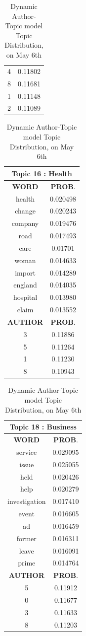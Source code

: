 \begin{table}[h!]
\begin{tabular}{|c c|}
4 &  0.11802\\
8  &   0.11681\\
1   &  0.11148\\
2   &  0.11089\\
 \hline
 \end{tabular} 
\hfill
 \begin{tabular}{|c c|} 
\hline
\multicolumn{2}{|c|}{\textbf{Topic 16 : Health}} \\
\hline
 \textbf{WORD} & \textbf{PROB}.  \\ [0.3ex] 
 \hline
	health  & 0.020498\\
	change  &  0.020243\\
	company  &  0.019476\\
	road   & 0.017493\\
	care  &  0.01701\\
	woman &   0.014633\\
	import  &  0.014289\\
	england   & 0.014035\\
	hospital  &  0.013980\\
	claim  &  0.013552\\ [1ex] 
 \hline
  \textbf{AUTHOR} & \textbf{PROB}.  \\ [0.3ex] 
 \hline
 3 &  0.11886\\
5  &   0.11264\\
1  &   0.11230\\
8  &   0.10943  \\
 \hline
 \end{tabular} 
\hfill
\begin{tabular}{|c c|} 
\hline
\multicolumn{2}{|c|}{\textbf{Topic 18 : Business}} \\
\hline
 \textbf{WORD} & \textbf{PROB}.  \\ [0.3ex] 
 \hline
 service &  0.029095 \\
	issue &     0.025055 \\
	held   &   0.020426 \\
	help   &   0.020279 \\
	investigation &     0.017410 \\
	event   &   0.016605 \\
	ad   &   0.016459 \\
	former  &    0.016311 \\
	leave   &   0.016091 \\
	prime &     0.014764 \\ [1ex] 
 \hline
  \textbf{AUTHOR} & \textbf{PROB}.  \\ [0.3ex] 
 \hline
5  & 0.11912\\
0   &  0.11677 \\
3  &   0.11633\\
8  &   0.11203  \\
 \hline
 \end{tabular} 
\hfill
\caption{Dynamic Author-Topic model Topic Distribution, on May 6th}
\label{table:datat_topic_distribution}
\end{table}


